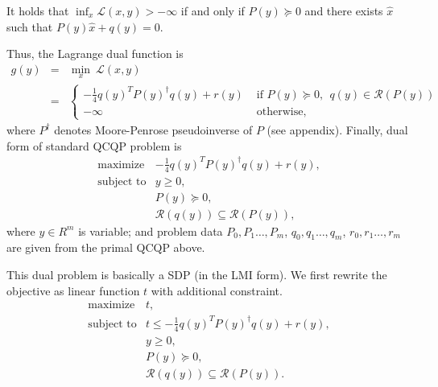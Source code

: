 \documentclass[12pt]{book}
\theoremstyle{definition}
\begin{document}
It holds that $\inf_x\mathcal{L}(x,y) > -\infty$ if and only if $P(y)\succeq 0$ and there exists $\hat{x}$ such that  $P(y)\hat{x} + q(y) = 0.$

Thus, the Lagrange dual function is 
\begin{eqnarray*}
g(y) &=& \min_x \ \mathcal{L}(x,y) \\
&=& \left\lbrace \begin{array}{ll} 
-\frac{1}{4}q(y)^TP(y)^{\dagger}q(y) + r(y) & \mbox{ if } P(y)\succeq 0,\ \ q(y)\in\mathcal{R}(P(y))\\ 
-\infty & \mbox{ otherwise,}
\end{array}\right. 
\end{eqnarray*}
where $P^\dagger$ denotes Moore-Penrose pseudoinverse of $P$ (see appendix).
Finally, dual form of standard QCQP problem is 
\begin{equation}
\label{QCQD} 
\begin{array}{ll}
\mbox{maximize} & -\frac{1}{4}q(y)^TP(y)^{\dagger}q(y) + r(y), \\
\mbox{subject to}&  y \geq 0,\\
& P(y )\succeq 0, \\
& \mathcal{R}(q(y)) \subseteq \mathcal{R}(P(y)),
\end{array} 
\tag{QCQP Dual}
\end{equation}
where $y\in R^m$ is variable; and problem data $P_0,P_1\dots ,P_m$, $q_0,q_1\dots ,q_m$, $r_0,r_1\dots , r_m$ are given from the primal QCQP above.


This dual problem is basically a SDP (in the LMI form). We first rewrite the objective as linear function $t$ with additional constraint.
\begin{equation*}
\begin{array}{ll}
\mbox{maximize} & t ,\\
\mbox{subject to}&  t\leq -\frac{1}{4}q(y)^TP(y)^{\dagger}q(y) + r(y), \\
&y \geq 0,\\
& P(y )\succeq 0,\\
& \mathcal{R}(q(y)) \subseteq \mathcal{R}(P(y)).
\end{array} 
\end{equation*}
\end{document}
